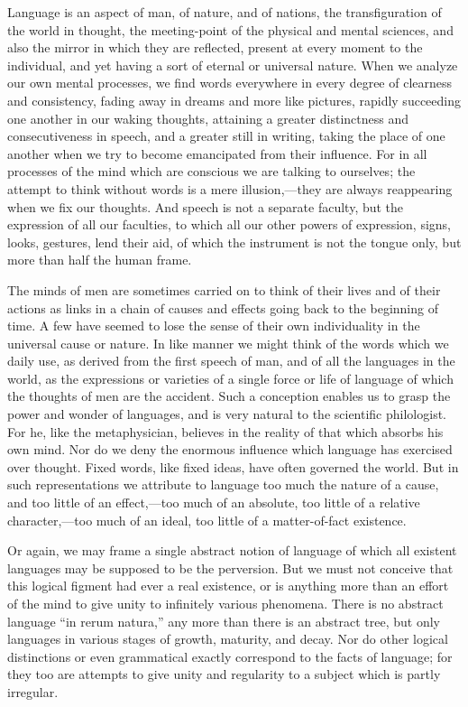 \documentclass[11pt,letter]{article}
\begin{document}
\par  Language is an aspect of man, of nature, and of nations, the transfiguration of the world in thought, the meeting-point of the physical and mental sciences, and also the mirror in which they are reflected, present at every moment to the individual, and yet having a sort of eternal or universal nature. When we analyze our own mental processes, we find words everywhere in every degree of clearness and consistency, fading away in dreams and more like pictures, rapidly succeeding one another in our waking thoughts, attaining a greater distinctness and consecutiveness in speech, and a greater still in writing, taking the place of one another when we try to become emancipated from their influence. For in all processes of the mind which are conscious we are talking to ourselves; the attempt to think without words is a mere illusion,—they are always reappearing when we fix our thoughts. And speech is not a separate faculty, but the expression of all our faculties, to which all our other powers of expression, signs, looks, gestures, lend their aid, of which the instrument is not the tongue only, but more than half the human frame.

\par  The minds of men are sometimes carried on to think of their lives and of their actions as links in a chain of causes and effects going back to the beginning of time. A few have seemed to lose the sense of their own individuality in the universal cause or nature. In like manner we might think of the words which we daily use, as derived from the first speech of man, and of all the languages in the world, as the expressions or varieties of a single force or life of language of which the thoughts of men are the accident. Such a conception enables us to grasp the power and wonder of languages, and is very natural to the scientific philologist. For he, like the metaphysician, believes in the reality of that which absorbs his own mind. Nor do we deny the enormous influence which language has exercised over thought. Fixed words, like fixed ideas, have often governed the world. But in such representations we attribute to language too much the nature of a cause, and too little of an effect,—too much of an absolute, too little of a relative character,—too much of an ideal, too little of a matter-of-fact existence.

\par  Or again, we may frame a single abstract notion of language of which all existent languages may be supposed to be the perversion. But we must not conceive that this logical figment had ever a real existence, or is anything more than an effort of the mind to give unity to infinitely various phenomena. There is no abstract language “in rerum natura,” any more than there is an abstract tree, but only languages in various stages of growth, maturity, and decay. Nor do other logical distinctions or even grammatical exactly correspond to the facts of language; for they too are attempts to give unity and regularity to a subject which is partly irregular.
\end{document}
